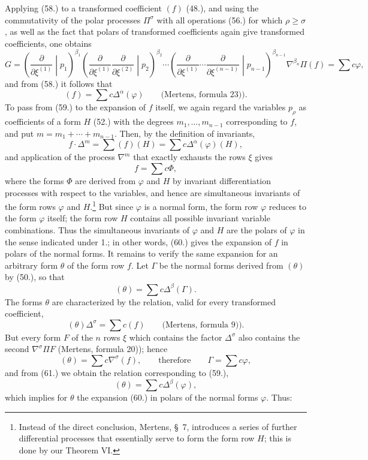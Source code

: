\documentclass[11pt]{article}
\begin{document}
Applying (58.) to a transformed coefficient $(f)$ (48.), and using the commutativity of the polar processes $\Pi^\sigma$ with all operations (56.) for which $\rho\ge\sigma$, as well as the fact that polars of transformed coefficients again give transformed coefficients, one obtains
\[
 G=\left(\frac{\partial}{\partial\xi^{(1)}}\middle|p_1\right)^{\beta_1}
 \left(\frac{\partial}{\partial\xi^{(1)}}\frac{\partial}{\partial\xi^{(2)}}\middle|p_2\right)^{\beta_2}
 \cdots
 \left(\frac{\partial}{\partial\xi^{(1)}}\cdots\frac{\partial}{\partial\xi^{(n-1)}}\middle|p_{n-1}\right)^{\beta_{n-1}}
 \nabla^{\beta_n}\Pi(f)=\sum c\varphi,
\]
and from (58.) it follows that
\begin{equation}
 (f)=\sum c\Delta^\alpha(\varphi)\qquad\text{(Mertens, formula 23)).}
\tag{59}
\end{equation}
To pass from (59.) to the expansion of $f$ itself, we again regard the variables $p_\rho$ as coefficients of a form $H$ (52.) with the degrees $m_1,
\ldots,m_{n-1}$ corresponding to $f$, and put $m=m_1+\cdots+m_{n-1}$. Then, by the definition of invariants,
\[
 f\cdot\Delta^m=\sum(f)(H)=\sum c\Delta^\alpha(\varphi)(H),
\]
and application of the process $\nabla^m$ that exactly exhausts the rows $\xi$ gives
\begin{equation}
 f=\sum c\Phi,
\tag{60}
\end{equation}
where the forms $\Phi$ are derived from $\varphi$ and $H$ by invariant differentiation processes with respect to the variables, and hence are simultaneous invariants of the form rows $\varphi$ and $H$.\footnote{Instead of the direct conclusion, Mertens, \S\ 7, introduces a series of further differential processes that essentially serve to form the form row $H$; this is done by our Theorem VI.} But since $\varphi$ is a normal form, the form row $\varphi$ reduces to the form $\varphi$ itself; the form row $H$ contains all possible invariant variable combinations. Thus the simultaneous invariants of $\varphi$ and $H$ are the polars of $\varphi$ in the sense indicated under 1.; in other words, (60.) gives the expansion of $f$ in polars of the normal forms. It remains to verify the same expansion for an arbitrary form $\theta$ of the form row $f$. Let $\Gamma$ be the normal forms derived from $(\theta)$ by (50.), so that
\begin{equation}
 (\theta)=\sum c\Delta^\beta(\Gamma).
\tag{61}
\end{equation}
The forms $\theta$ are characterized by the relation, valid for every transformed coefficient,
\[
 (\theta)\Delta^\sigma=\sum c(f)\qquad\text{(Mertens, formula 9)).}
\]
But every form $F$ of the $n$ rows $\xi$ which contains the factor $\Delta^\sigma$ also contains the second $\nabla^\sigma\Pi F$ (Mertens, formula 20)); hence
\[
 (\theta)=\sum c\nabla^\sigma(f),\qquad\text{therefore}\qquad \Gamma=\sum c\varphi,
\]
and from (61.) we obtain the relation corresponding to (59.),
\[
 (\theta)=\sum c\Delta^\beta(\varphi),
\]
which implies for $\theta$ the expansion (60.) in polars of the normal forms $\varphi$. Thus:
\end{document}
